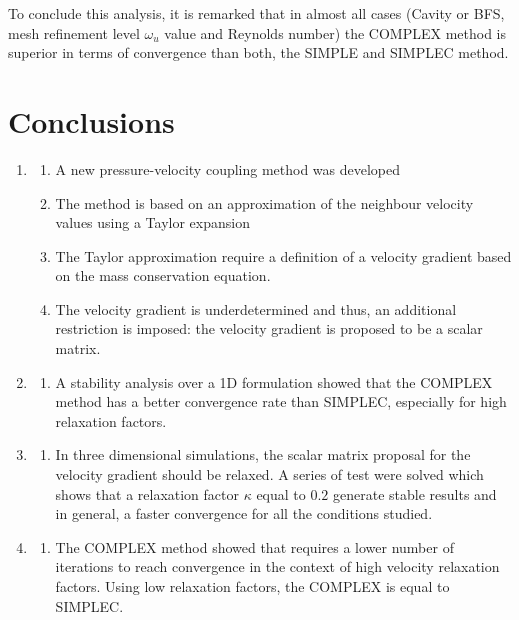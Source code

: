 \documentclass[final,3p,times,11pt,onecolumn]{myElsarticle}
\numberwithin{equation}{section}
\begin{document}
To conclude this analysis, it is remarked that in almost all cases (Cavity or BFS, mesh refinement level $\omega_u$ value and Reynolds number) the COMPLEX method is superior in terms of convergence than both, the SIMPLE and SIMPLEC method. 








\section{Conclusions}
\label{sec:conclusions}

\begin{enumerate}

\item \begin{enumerate}
\item A new pressure-velocity coupling method was developed
\item The method is based on an approximation of the neighbour velocity values using a Taylor expansion
\item The Taylor approximation require a definition of a velocity gradient based on the mass conservation equation.
\item The velocity gradient is underdetermined and thus, an additional restriction is imposed: the velocity gradient is proposed to be a scalar matrix.
\end{enumerate} 
\item \begin{enumerate}
\item A stability analysis over a 1D formulation showed that the COMPLEX method has a better convergence rate than SIMPLEC, especially for high relaxation factors.
\end{enumerate}
\item \begin{enumerate}
\item In three dimensional simulations, the scalar matrix proposal for the velocity gradient should be relaxed. A series of test were solved which shows that a relaxation factor $\kappa$ equal to $0.2$ generate stable results and in general,  a faster convergence for all the conditions studied.
\end{enumerate}
\item  
\begin{enumerate}
\item The COMPLEX method showed that requires a lower number of iterations to reach convergence in the context of high velocity relaxation factors. Using low relaxation factors, the COMPLEX is equal to SIMPLEC.

\end{enumerate}
\end{enumerate}
\end{document}
